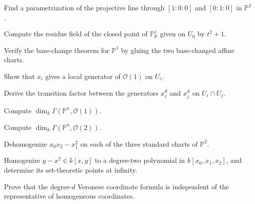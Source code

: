 \begin{exercise}\label{exr:vi36-10}
Find a parametrization of the projective line through \([1:0:0]\) and \([0:1:0]\) in \(\mathbb P^2\).
\end{exercise}

\begin{exercise}\label{exr:vi36-11}
Compute the residue field of the closed point of \(\mathbb P^1_{\mathbb R}\) given on \(U_0\) by \(t^2+1\).
\end{exercise}

\begin{exercise}\label{exr:vi36-12}
Verify the base-change theorem for \(\mathbb P^1\) by gluing the two base-changed affine charts.
\end{exercise}

\begin{exercise}\label{exr:vi36-13}
Show that \(x_i\) gives a local generator of \(\mathcal O(1)\) on \(U_i\).
\end{exercise}

\begin{exercise}\label{exr:vi36-14}
Derive the transition factor between the generators \(x_i^d\) and \(x_j^d\) on \(U_i\cap U_j\).
\end{exercise}

\begin{exercise}\label{exr:vi36-15}
Compute \(\dim_k\Gamma(\mathbb P^n,\mathcal O(1))\).
\end{exercise}

\begin{exercise}\label{exr:vi36-16}
Compute \(\dim_k\Gamma(\mathbb P^n,\mathcal O(2))\).
\end{exercise}

\begin{exercise}[Dehomogenization]\label{exr:vi36-17}
Dehomogenize \(x_0x_2-x_1^2\) on each of the three standard charts of \(\mathbb P^2\).
\end{exercise}

\begin{exercise}[Homogenization]\label{exr:vi36-18}
Homogenize \(y-x^2\in k[x,y]\) to a degree-two polynomial in \(k[x_0,x_1,x_2]\), and determine its set-theoretic points at infinity.
\end{exercise}

\begin{exercise}\label{exr:vi36-19}
Prove that the degree-\(d\) Veronese coordinate formula is independent of the representative of homogeneous coordinates.
\end{exercise}


